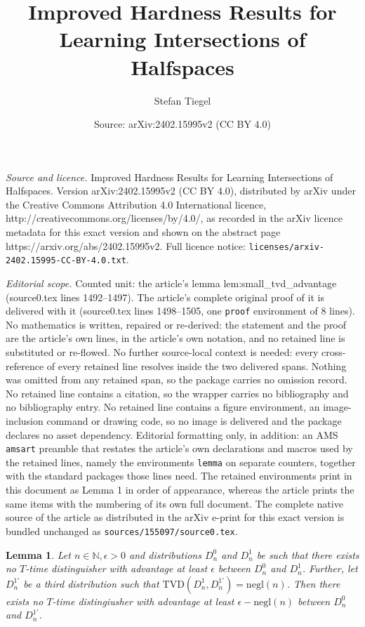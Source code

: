 \documentclass[10pt,a4paper]{amsart}
\title{Improved Hardness Results for Learning Intersections of Halfspaces}
\author{Stefan Tiegel}
\date{Source: arXiv:2402.15995v2 (CC BY 4.0)}
\newtheorem{lemma}{Lemma}
\newcommand{\N}{\mathbb N}
\newcommand{\TVD}[2]{\mathrm{TVD}(#1,#2)}
\newcommand{\e}{\epsilon}
\newcommand{\negl}{\mathrm{negl}}
\begin{document}
\maketitle

\noindent\emph{Source and licence.} Improved Hardness Results for Learning Intersections of Halfspaces. Version arXiv:2402.15995v2 (CC BY 4.0), distributed by arXiv under the Creative Commons Attribution 4.0 International licence, http://creativecommons.org/licenses/by/4.0/, as recorded in the arXiv licence metadata for this exact version and shown on the abstract page https://arxiv.org/abs/2402.15995v2. Full licence notice: \texttt{licenses/arxiv-2402.15995-CC-BY-4.0.txt}.\par\smallskip

\noindent\textit{Editorial scope.} Counted unit: the article's lemma lem:small\_tvd\_advantage (source0.tex lines 1492--1497). The article's complete original proof of it is delivered with it (source0.tex lines 1498--1505, one \texttt{proof} environment of 8 lines). No mathematics is written, repaired or re-derived: the statement and the proof are the article's own lines, in the article's own notation, and no retained line is substituted or re-flowed.  No further source-local context is needed: every cross-reference of every retained line resolves inside the two delivered spans.  Nothing was omitted from any retained span, so the package carries no omission record.  No retained line contains a citation, so the wrapper carries no bibliography and no bibliography entry.  No retained line contains a figure environment, an image-inclusion command or drawing code, so no image is delivered and the package declares no asset dependency.  Editorial formatting only, in addition: an AMS \texttt{amsart} preamble that restates the article's own declarations and macros used by the retained lines, namely the environments \texttt{lemma} on separate counters, together with the standard packages those lines need.  The retained environments print in this document as Lemma 1 in order of appearance, whereas the article prints the same items with the numbering of its own full document.  The complete native source of the article as distributed in the arXiv e-print for this exact version is bundled unchanged as \texttt{sources/155097/source0.tex}.
\begin{lemma}
    \label{lem:small_tvd_advantage}
    Let $n \in \N, \e > 0$ and distributions $D_n^0$ and $D_n^1$ be such that there exists no $T$-time distinguisher with advantage at least $\e$ between $D_n^0$ and $D_n^1$.
    Further, let $D_n^{1'}$ be a third distribution such that $\TVD{D_n^1}{D_n^{1'}} = \negl(n)$.
    Then there exists no $T$-time distingiusher with advantage at least $\e - \negl(n)$ between $D_n^0$ and $D_n^{1'}$.
\end{lemma}
\end{document}
